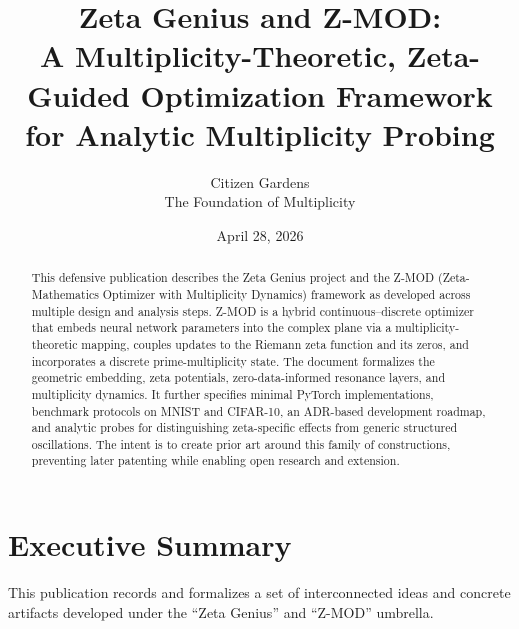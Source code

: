 \documentclass[11pt]{article}
\title{Zeta Genius and Z-MOD:\\
A Multiplicity-Theoretic, Zeta-Guided Optimization Framework\\
for Analytic Multiplicity Probing}
\author{Citizen Gardens \\ The Foundation of Multiplicity}
\date{April 28, 2026}
\begin{document}
\maketitle

\begin{abstract}
This defensive publication describes the Zeta Genius project and the Z-MOD (Zeta-Mathematics Optimizer with Multiplicity Dynamics) framework as developed across multiple design and analysis steps. Z-MOD is a hybrid continuous--discrete optimizer that embeds neural network parameters into the complex plane via a multiplicity-theoretic mapping, couples updates to the Riemann zeta function and its zeros, and incorporates a discrete prime-multiplicity state. The document formalizes the geometric embedding, zeta potentials, zero-data-informed resonance layers, and multiplicity dynamics. It further specifies minimal PyTorch implementations, benchmark protocols on MNIST and CIFAR-10, an ADR-based development roadmap, and analytic probes for distinguishing zeta-specific effects from generic structured oscillations. The intent is to create prior art around this family of constructions, preventing later patenting while enabling open research and extension.
\end{abstract}
\newpage
\tableofcontents

\section{Executive Summary}

This publication records and formalizes a set of interconnected ideas and concrete artifacts developed under the ``Zeta Genius'' and ``Z-MOD'' umbrella.
\end{document}
